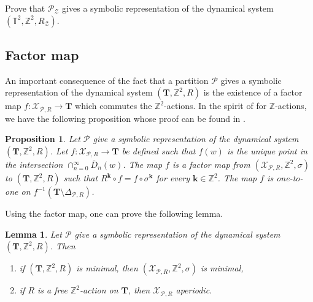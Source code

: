 \documentclass[12pt]{amsart}
\newtheorem{lemma}[definition]{Lemma}
\newtheorem{proposition}[definition]{Proposition}
\newcommand{\Z}{\mathbb{Z}}
\newcommand{\bk}{{\boldsymbol{k}}}
\newcommand{\Pcal}{\mathcal{P}}
\newcommand{\Xcal}{\mathcal{X}} %
\newcommand{\Zcal}{\mathcal{Z}}
\newcommand{\generictorus}{{\boldsymbol{T}}}
\newcommand{\torus}{\mathbb{T}}
\begin{document}
\begin{exo}[label={exo:symbolic-representation}]
    Prove that $\Pcal_\Zcal$ gives a symbolic representation of the dynamical system
    $(\torus^2,\Z^2,R_\Zcal)$.
\end{exo}


\subsection{Factor map}

An important consequence of the fact that
a partition $\Pcal$ gives a symbolic representation of the dynamical system
$(\generictorus,\Z^2,R)$ is the existence of a
factor map $f:\Xcal_{\Pcal,R}\to\generictorus$ which commutes the
$\Z^2$-actions.
In the spirit of \cite[Prop.~6.5.8]{MR1369092} for $\Z$-actions,
we have the following proposition whose
proof can be found in \cite{MR4213162}.

\begin{proposition}\label{prop:factor-map}
    {\rm\cite[Prop.~5.1]{MR4213162}}
    Let $\Pcal$ give a symbolic representation of the dynamical system
    $(\generictorus,\Z^2,R)$.
    Let $f:\Xcal_{\Pcal,R}\to\generictorus$ be defined 
    such that $f(w)$ is the unique point
    in the intersection $\cap_{n=0}^{\infty}\overline{D}_n(w)$.
    The map $f$ is a factor map from
            $(\Xcal_{\Pcal,R},\Z^2,\sigma)$ to $(\generictorus,\Z^2,R)$
            such that $R^\bk\circ f = f\circ\sigma^\bk$
    for every $\bk\in\Z^2$.
    The map $f$ is one-to-one on
    $f^{-1}(\generictorus\setminus\Delta_{\Pcal,R})$.
\end{proposition}

Using the factor map, one can prove the following lemma.

\begin{lemma}\label{lem:minimal-aperiodic}
    {\rm\cite[Lemma~5.2]{MR4213162}}
    Let $\Pcal$ give a symbolic representation of the dynamical system
    $(\generictorus,\Z^2,R)$. Then
\begin{enumerate}[\rm (i)]
    \item if $(\generictorus,\Z^2,R)$ is minimal,
        then $(\Xcal_{\Pcal,R},\Z^2,\sigma)$ is minimal,
    \item if $R$ is a free $\Z^2$-action on $\generictorus$,
        then $\Xcal_{\Pcal,R}$ aperiodic.
\end{enumerate}
\end{lemma}
\end{document}
